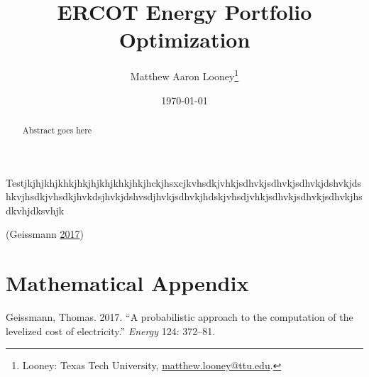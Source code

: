 \documentclass[AER]{AEA}
\begin{document}
\title{ERCOT Energy Portfolio Optimization}


\author{
  Matthew Aaron Looney\thanks{
  Looney: Texas Tech University, \href{mailto:matthew.looney@ttu.edu}{matthew.looney@ttu.edu}.
}
}

\date{\today}
\JEL{}
\Keywords{}

\begin{abstract}
Abstract goes here
\end{abstract}


\maketitle

Testjkjhjkhjkhkjhkjhjkhjkhkjhkjhckjhsxcjkvhsdkjvhkjsdhvkjsdhvkjsdhvkjdshvkjdshkvjhsdkjvhsdkjhvkdsjhvkjdshvsdjhvkjsdhvkjhdskjvhsdjvhkjsdhvkjsdhvkjsdhvkjhsdkvhjdksvhjk

(Geissmann \protect\hyperlink{ref-Geissmann:2017ux}{2017})



\appendix

\section{Mathematical Appendix}

\hypertarget{refs}{}
\hypertarget{ref-Geissmann:2017ux}{}
Geissmann, Thomas. 2017. ``A probabilistic approach to the computation
of the levelized cost of electricity.'' \emph{Energy} 124: 372--81.
\end{document}
